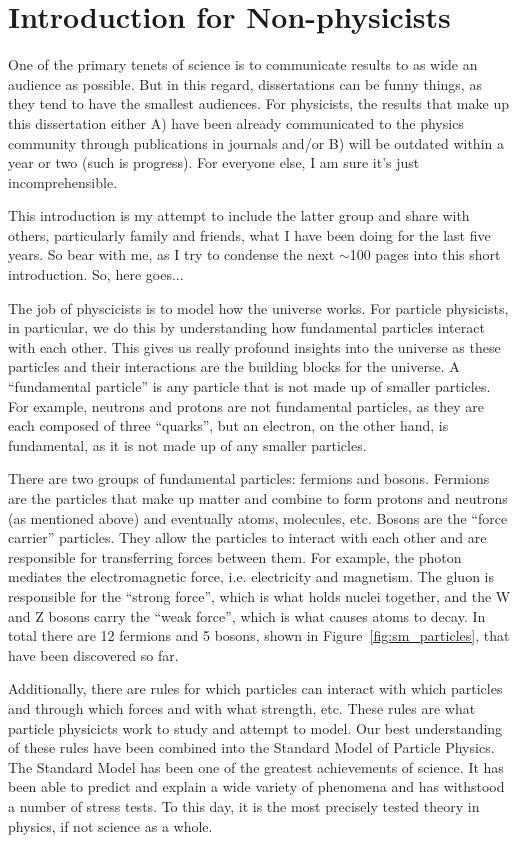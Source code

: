 \chapter{Introduction for Non-physicists}

One of the primary tenets of science is to communicate results to as wide an audience as possible.
But in this regard, dissertations can be funny things, as they tend to have the smallest audiences.
For physicists, the results that make up this dissertation either A) have been already communicated to the physics community through publications in journals and/or B) will be outdated within a year or two (such is progress).
For everyone else, I am sure it's just incomprehensible.

This introduction is my attempt to include the latter group and share with others, particularly family and friends, what I have been doing for the last five years.
So bear with me, as I try to condense the next $\sim$100 pages into this short introduction.
So, here goes...

The job of physcicists is to model how the universe works.
For particle physicists, in particular, we do this by understanding how fundamental particles interact with each other.
This gives us really profound insights into the universe as these particles and their interactions are the building blocks for the universe.
A ``fundamental particle'' is any particle that is not made up of smaller particles.
For example, neutrons and protons are not fundamental particles, as they are each composed of three ``quarks'', but an electron, on the other hand, is fundamental, as it is not made up of any smaller particles. 

There are two groups of fundamental particles: fermions and bosons.
Fermions are the particles that make up matter and combine to form protons and neutrons (as mentioned above) and eventually atoms, molecules, etc.
Bosons are the ``force carrier'' particles.
They allow the particles to interact with each other and are responsible for transferring forces between them.
For example, the photon mediates the electromagnetic force, i.e. electricity and magnetism.
The gluon is responsible for the ``strong force'', which is what holds nuclei together, and the W and Z bosons carry the ``weak force'', which is what causes atoms to decay.
In total there are 12 fermions and 5 bosons, shown in Figure~\ref{fig:sm_particles}, that have been discovered so far.

Additionally, there are rules for which particles can interact with which particles and through which forces and with what strength, etc.
These rules are what particle physicicts work to study and attempt to model.
Our best understanding of these rules have been combined into the Standard Model of Particle Physics.
The Standard Model has been one of the greatest achievements of science.
It has been able to predict and explain a wide variety of phenomena and has withstood a number of stress tests.
To this day, it is the most precisely tested theory in physics, if not science as a whole.

